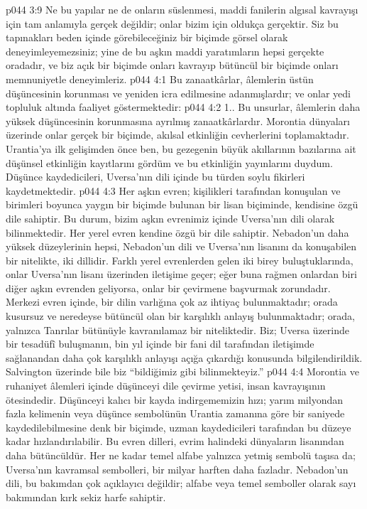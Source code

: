 \vs p044 3:9 Ne bu yapılar ne de onların süslenmesi, maddi fanilerin algısal kavrayışı için tam anlamıyla gerçek değildir; onlar bizim için oldukça gerçektir. Siz bu tapınakları beden içinde görebileceğiniz bir biçimde görsel olarak deneyimleyemezsiniz; yine de bu aşkın maddi yaratımların hepsi gerçekte oradadır, ve biz açık bir biçimde onları kavrayıp bütüncül bir biçimde onları memnuniyetle deneyimleriz.
\vs p044 4:1 Bu zanaatkârlar, âlemlerin üstün düşüncesinin korunması ve yeniden icra edilmesine adanmışlardır; ve onlar yedi topluluk altında faaliyet göstermektedir:
\vs p044 4:2 1.\bibnobreakspace {}. Bu unsurlar, âlemlerin daha yüksek düşüncesinin korunmasına ayrılmış zanaatkârlardır. Morontia dünyaları üzerinde onlar gerçek bir biçimde, akılsal etkinliğin cevherlerini toplamaktadır. Urantia’ya ilk gelişimden önce ben, bu gezegenin büyük akıllarının bazılarına ait düşünsel etkinliğin kayıtlarını gördüm ve bu etkinliğin yayınlarını duydum. Düşünce kaydedicileri, Uversa’nın dili içinde bu türden soylu fikirleri kaydetmektedir.
\vs p044 4:3 Her aşkın evren; kişilikleri tarafından konuşulan ve birimleri boyunca yaygın bir biçimde bulunan bir lisan biçiminde, kendisine özgü dile sahiptir. Bu durum, bizim aşkın evrenimiz içinde Uversa’nın dili olarak bilinmektedir. Her yerel evren kendine özgü bir dile sahiptir. Nebadon’un daha yüksek düzeylerinin hepsi, Nebadon’un dili ve Uversa’nın lisanını da konuşabilen bir nitelikte, iki dillidir. Farklı yerel evrenlerden gelen iki birey buluştuklarında, onlar Uversa’nın lisanı üzerinden iletişime geçer; eğer buna rağmen onlardan biri diğer aşkın evrenden geliyorsa, onlar bir çevirmene başvurmak zorundadır. Merkezi evren içinde, bir dilin varlığına çok az ihtiyaç bulunmaktadır; orada kusursuz ve neredeyse bütüncül olan bir karşılıklı anlayış bulunmaktadır; orada, yalnızca Tanrılar bütünüyle kavranılamaz bir niteliktedir. Biz; Uversa üzerinde bir tesadüfî buluşmanın, bin yıl içinde bir fani dil tarafından iletişimde sağlanandan daha çok karşılıklı anlayışı açığa çıkardığı konusunda bilgilendirildik. Salvington üzerinde bile biz “bildiğimiz gibi bilinmekteyiz.”
\vs p044 4:4 Morontia ve ruhaniyet âlemleri içinde düşünceyi dile çevirme yetisi, insan kavrayışının ötesindedir. Düşünceyi kalıcı bir kayda indirgememizin hızı; yarım milyondan fazla kelimenin veya düşünce sembolünün Urantia zamanına göre bir saniyede kaydedilebilmesine denk bir biçimde, uzman kaydedicileri tarafından bu düzeye kadar hızlandırılabilir. Bu evren dilleri, evrim halindeki dünyaların lisanından daha bütüncüldür. Her ne kadar temel alfabe yalnızca yetmiş sembolü taşısa da; Uversa’nın kavramsal sembolleri, bir milyar harften daha fazladır. Nebadon’un dili, bu bakımdan çok açıklayıcı değildir; alfabe veya temel semboller olarak sayı bakımından kırk sekiz harfe sahiptir.
